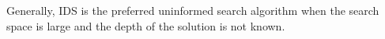 Generally, IDS is the preferred uninformed search algorithm when the search space is large and the depth of the solution is not known.






\newpage